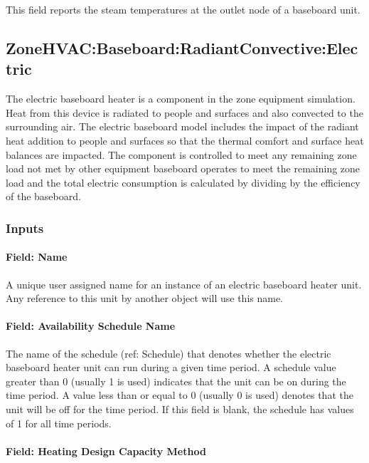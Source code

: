 This field reports the steam temperatures at the outlet node of a baseboard unit.

\subsection{ZoneHVAC:Baseboard:RadiantConvective:Electric}\label{zonehvacbaseboardradiantconvectiveelectric}

The electric baseboard heater is a component in the zone equipment simulation. Heat from this device is radiated to people and surfaces and also convected to the surrounding air. The electric baseboard model includes the impact of the radiant heat addition to people and surfaces so that the thermal comfort and surface heat balances are impacted. The component is controlled to meet any remaining zone load not met by other equipment baseboard operates to meet the remaining zone load and the total electric consumption is calculated by dividing by the efficiency of the baseboard.

\subsubsection{Inputs}\label{inputs-2-032}

\paragraph{Field: Name}\label{field-name-2-031}

A unique user assigned name for an instance of an electric baseboard heater unit. Any reference to this unit by another object will use this name.

\paragraph{Field: Availability Schedule Name}\label{field-availability-schedule-name-2-006}

The name of the schedule (ref: Schedule) that denotes whether the electric baseboard heater unit can run during a given time period. A schedule value greater than 0 (usually 1 is used) indicates that the unit can be on during the time period. A value less than or equal to 0 (usually 0 is used) denotes that the unit will be off for the time period. If this field is blank, the schedule has values of 1 for all time periods.

\paragraph{Field: Heating Design Capacity Method}\label{field-heating-design-capacity-method-2}

